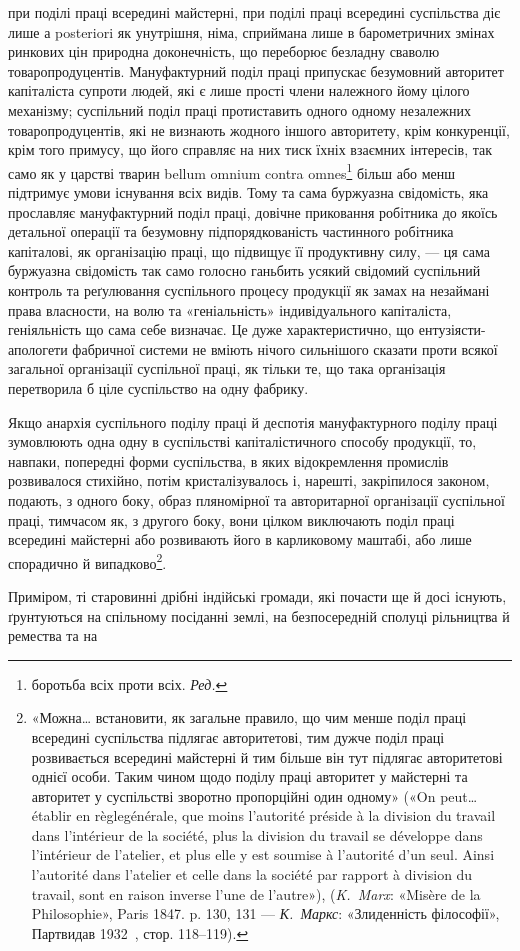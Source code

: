 \parcont{}  %
при поділі праці всередині майстерні, при поділі праці всередині
суспільства діє лише а posteriori як унутрішня, німа, сприймана
лише в барометричних змінах ринкових цін природна доконечність,
що переборює безладну сваволю товаропродуцентів. Мануфактурний
поділ праці припускає безумовний авторитет капіталіста
супроти людей, які є лише прості члени належного йому цілого
механізму; суспільний поділ праці протиставить одного одному
незалежних товаропродуцентів, які не визнають жодного іншого
авторитету, крім конкуренції, крім того примусу, що його справляє
на них тиск їхніх взаємних інтересів, так само як у царстві
тварин bellum omnium contra omnes\footnote*{
боротьба всіх проти всіх. \emph{Ред.}
} більш або менш підтримує
умови існування всіх видів. Тому та сама буржуазна свідомість,
яка прославляє мануфактурний поділ праці, довічне приковання
робітника до якоїсь детальної операції та безумовну підпорядкованість
частинного робітника капіталові, як організацію
праці, що підвищує її продуктивну силу, — ця сама буржуазна
свідомість так само голосно ганьбить усякий свідомий суспільний
контроль та реґулювання суспільного процесу продукції як замах
на незаймані права власности, на волю та «геніальність» індивідуального
капіталіста, геніяльність що сама себе визначає.
Це дуже характеристично, що ентузіясти-апологети фабричної
системи не вміють нічого сильнішого сказати проти всякої загальної
організації суспільної праці, як тільки те, що така організація
перетворила б ціле суспільство на одну фабрику.

Якщо анархія суспільного поділу праці й деспотія мануфактурного
поділу праці зумовлюють одна одну в суспільстві капіталістичного
способу продукції, то, навпаки, попередні форми
суспільства, в яких відокремлення промислів розвивалося стихійно,
потім кристалізувалось і, нарешті, закріпилося законом,
подають, з одного боку, образ пляномірної та авторитарної
організації суспільної праці, тимчасом як, з другого боку, вони
цілком виключають поділ праці всередині майстерні або розвивають
його в карликовому маштабі, або лише спорадично й випадково\footnote{
«Можна\dots{} встановити, як загальне правило, що чим менше поділ
праці всередині суспільства підлягає авторитетові, тим дужче поділ
праці розвивається всередині майстерні й тим більше він тут підлягає
авторитетові однієї особи. Таким чином щодо поділу праці авторитет
у майстерні та авторитет у суспільстві зворотно пропорційні один
одному» («On peut\dots{} établir en règlegénérale, que moins l’autorité préside
à la division du travail dans l’intérieur de la société, plus la division du
travail se développe dans l’intérieur de l’atelier, et plus elle y est soumise
à l’autorité d’un seul. Ainsi l’autorité dans l’atelier et celle dans la société
par rapport à division du travail, sont en raison inverse l’une de l’autre»),
(\emph{K.~Marx}: «Misère de la Philosophie», Paris 1847. p. 130, 131 — \emph{К.~Маркс}:
«Злиденність філософії», Партвидав 1932~, стор. 118--119).
}.

Приміром, ті старовинні дрібні індійські громади, які почасти
ще й досі існують, ґрунтуються на спільному посіданні
землі, на безпосередній сполуці рільництва й ремества та на
\parbreak{}  %
